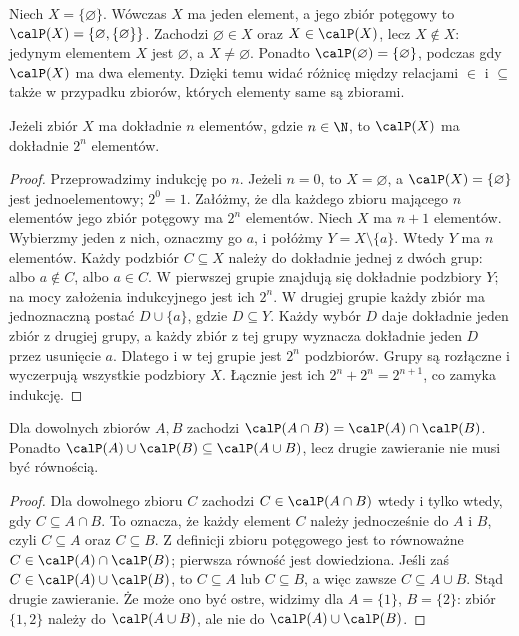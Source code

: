\begin{uwaga}
\label{rem:powerset-membership-xlii}
Niech $X=\{\varnothing\}$. Wówczas $X$ ma jeden element,
a jego zbiór potęgowy to
$\calP(X)=\{\varnothing,\{\varnothing\}\}$.
Zachodzi $\varnothing\in X$ oraz $X\in\calP(X)$,
lecz $X\notin X$: jedynym elementem $X$ jest
$\varnothing$, a $X\ne\varnothing$. Ponadto
$\calP(\varnothing)=\{\varnothing\}$, podczas gdy
$\calP(X)$ ma dwa elementy. Dzięki temu widać różnicę
między relacjami $\in$ i $\subseteq$ także w przypadku
zbiorów, których elementy same są zbiorami.
\end{uwaga}


\begin{twierdzenie}
\label{thm:powerset-finite}
Jeżeli zbiór $X$ ma dokładnie $n$ elementów, gdzie $n\in\N$,
to $\calP(X)$ ma dokładnie $2^n$ elementów.
\end{twierdzenie}
\begin{proof}
Przeprowadzimy indukcję po $n$. Jeżeli $n=0$, to $X=\varnothing$,
a $\calP(X)=\{\varnothing\}$ jest jednoelementowy;
$2^0=1$.
Załóżmy, że dla każdego zbioru mającego $n$ elementów
jego zbiór potęgowy ma $2^n$ elementów. Niech $X$ ma $n+1$
elementów. Wybierzmy jeden z nich, oznaczmy go $a$,
i połóżmy $Y=X\setminus\{a\}$. Wtedy $Y$ ma $n$ elementów.
Każdy podzbiór $C\subseteq X$ należy do dokładnie jednej
z dwóch grup: albo $a\notin C$, albo $a\in C$.
W pierwszej grupie znajdują się dokładnie podzbiory $Y$;
na mocy założenia indukcyjnego jest ich $2^n$.
W drugiej grupie każdy zbiór ma jednoznaczną postać
$D\cup\{a\}$, gdzie $D\subseteq Y$. Każdy wybór $D$
daje dokładnie jeden zbiór z drugiej grupy,
a każdy zbiór z tej grupy wyznacza dokładnie jeden
$D$ przez usunięcie $a$. Dlatego i w tej grupie jest
$2^n$ podzbiorów.
Grupy są rozłączne i wyczerpują wszystkie podzbiory $X$.
Łącznie jest ich $2^n+2^n=2^{n+1}$, co zamyka indukcję.
\end{proof}

\begin{twierdzenie}
\label{thm:powerset-intersection}
Dla dowolnych zbiorów $A,B$ zachodzi
$\calP(A\cap B)=\calP(A)\cap\calP(B)$.
Ponadto $\calP(A)\cup\calP(B)\subseteq\calP(A\cup B)$,
lecz drugie zawieranie nie musi być równością.
\end{twierdzenie}
\begin{proof}
Dla dowolnego zbioru $C$ zachodzi
$C\in\calP(A\cap B)$ wtedy i tylko wtedy, gdy
$C\subseteq A\cap B$. To oznacza, że każdy element $C$
należy jednocześnie do $A$ i $B$, czyli
$C\subseteq A$ oraz $C\subseteq B$.
Z definicji zbioru potęgowego jest to równoważne
$C\in\calP(A)\cap\calP(B)$; pierwsza równość jest dowiedziona.
Jeśli zaś $C\in\calP(A)\cup\calP(B)$, to
$C\subseteq A$ lub $C\subseteq B$, a więc zawsze
$C\subseteq A\cup B$. Stąd drugie zawieranie.
Że może ono być ostre, widzimy dla $A=\{1\}$,
$B=\{2\}$: zbiór $\{1,2\}$ należy do
$\calP(A\cup B)$, ale nie do
$\calP(A)\cup\calP(B)$.
\end{proof}

